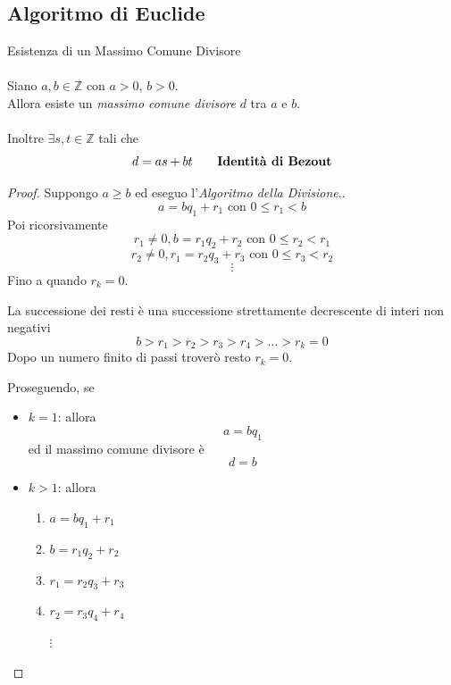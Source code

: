 \documentclass[a4paper,12pt, oneside]{book}
\begin{document}
	\subsection{Algoritmo di Euclide}
	\begin{teorema}
		Esistenza di un Massimo Comune Divisore\\\\
		Siano $a,b \in \mathbb{Z}$ con $a > 0$, $b > 0$.\\ 
		Allora esiste un \textit{massimo comune divisore} $d$ tra $a$ e $b$.\\\\
		Inoltre $\exists s, t \in \mathbb{Z}$  tali che
		$$d = as+bt \qquad \mbox{\textbf{Identità di Bezout}}$$
	\end{teorema}
	\begin{proof}
		Suppongo $a \geq b$ ed eseguo l'\textit{Algoritmo della Divisione}..
		$$a = bq_1+r_1 \mbox{ con } 0 \leq r_1 < b$$
		Poi ricorsivamente
		$$r_1 \not = 0, b = r_1q_2 + r_2 \mbox{ con } 0 \leq r_2 < r_1$$
		$$r_2 \not = 0, r_1 = r_2q_3 + r_3 \mbox{ con } 0 \leq r_3 < r_2$$
		$$\vdots$$
		Fino a quando $r_k = 0$.\\
		\begin{nota}
			La successione dei resti è una successione strettamente decrescente di interi non negativi
			$$b > r_1 > r_2 > r_3 > r_4 > \dots > r_k = 0$$
			Dopo un numero finito di passi troverò resto $r_k = 0$.			
		\end{nota}
		
		Proseguendo, se
		\begin{itemize}
			\item $k = 1$: allora
				$$a= bq_1$$ ed il massimo comune divisore è $$d = b$$
			\item $k > 1$: allora
			\begin{enumerate}[label=(\arabic*)]
				\item $a = bq_1 + r_1$
				\item $b = r_1q_2 + r_2$
				\item $r_1 = r_2q_3 + r_3$
				\item $r_2 = r_3q_4 + r_4$
				
				 $\vdots$
				 

\end{enumerate}
\end{itemize}
\end{proof}
\end{document}
